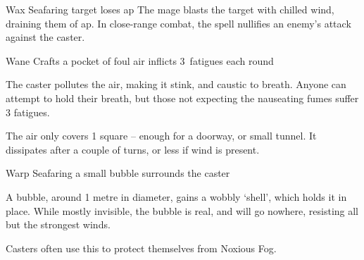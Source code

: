   {\mAir}%
  {Wax}%
  {}%
  {Seafaring}%
  {target loses  \gls{ap}}%
  {
    The mage blasts the target with chilled wind, draining them of  \gls{ap}.
    In close-range combat, the spell nullifies an enemy's attack against the caster.
  }

  {\mAir}%
  {Wane}%
  {}%
  {Crafts}%
  {a pocket of foul air inflicts 3~\glspl{fatigue} each round}%
  {
    The caster pollutes the air, making it stink, and caustic to breath.
    Anyone can attempt to hold their breath, but those not expecting the nauseating fumes suffer 3 \glspl{fatigue}.

    The air only covers 1 square -- enough for a doorway, or small tunnel.
    It dissipates after a couple of turns, or less if wind is present.
  }

  {\mAir}%
  {Warp}%
  {}%
  {Seafaring}%
  {a small bubble surrounds the caster}%
  {
    A bubble, around 1 metre in diameter, gains a wobbly `shell', which holds it in place.
    While mostly invisible, the bubble is real, and will go nowhere, resisting all but the strongest winds.

    Casters often use this to protect themselves from Noxious Fog.
  }


